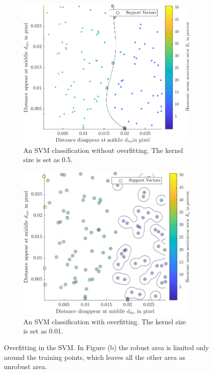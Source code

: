 \begin{figure}[htb]
\centering
\begin{subfigure}[t]{0.4\textwidth}
\includegraphics[width=\textwidth]{figures/Asso/overfitting2.png}
\caption{An SVM classification without overfitting. The kernel size is set as 0.5.}
\end{subfigure}
\quad
\begin{subfigure}[t]{0.4\textwidth}
\includegraphics[width=\textwidth]{figures/Asso/overfitting1.png}
\caption{An SVM classification with overfitting. The kernel size is set as 0.01.}
\label{overfitting example}
\end{subfigure}
\caption{Overfitting in the SVM. In Figure (b) the robust area is limited only around the training points, which leaves all the other area as unrobust area.}
\end{figure}

